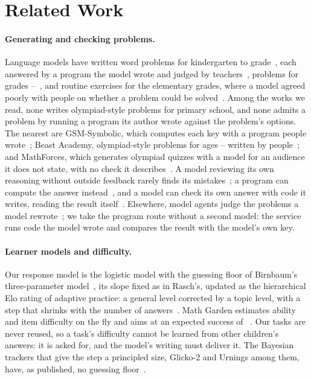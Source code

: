 \section{Related Work}
\label{sec:related}

\paragraph{Generating and checking problems.} Language models have written word problems for kindergarten to grade~, each answered by a program the model wrote and judged by teachers~\cite{christ2024mathwell}, problems for grades --~\cite{christ2026edumath}, and routine exercises for the elementary grades, where a model agreed poorly with people on whether a problem could be solved~\cite{ariyarathne2025elementary}. Among the works we read, none writes olympiad-style problems for primary school, and none admits a problem by running a program its author wrote against the problem's options. The nearest are GSM-Symbolic, which computes each key with a program people wrote~\cite{mirzadeh2024gsmsymbolic}; Beast Academy, olympiad-style problems for ages -- written by people~\cite{beastacademy2026}; and MathForces, which generates olympiad quizzes with a model for an audience it does not state, with no check it describes~\cite{mathforces2026}. A model reviewing its own reasoning without outside feedback rarely finds its mistakes~\cite{huang2023large}; a program can compute the answer instead~\cite{chen2022program}, and a model can check its own answer with code it writes, reading the result itself~\cite{zhou2023solving}. Elsewhere, model agents judge the problems a model rewrote~\cite{ikram2026multiagent}; we take the program route without a second model: the service runs code the model wrote and compares the result with the model's own key.

\paragraph{Learner models and difficulty.} Our response model is the logistic model with the guessing floor of Birnbaum's three-parameter model~\cite{birnbaum1968some}, its slope fixed as in Rasch's, updated as the hierarchical Elo rating of adaptive practice: a general level corrected by a topic level, with a step that shrinks with the number of answers~\cite{pelanek2017elobased}. Math Garden estimates ability and item difficulty on the fly and aims at an expected success of ~\cite{klinkenberg2011computer}. Our tasks are never reused, so a task's difficulty cannot be learned from other children's answers: it is asked for, and the model's writing must deliver it. The Bayesian trackers that give the step a principled size, Glicko-2 and Urnings among them, have, as published, no guessing floor~\cite{glickman2022glicko2,bolsinova2022urnings}.


